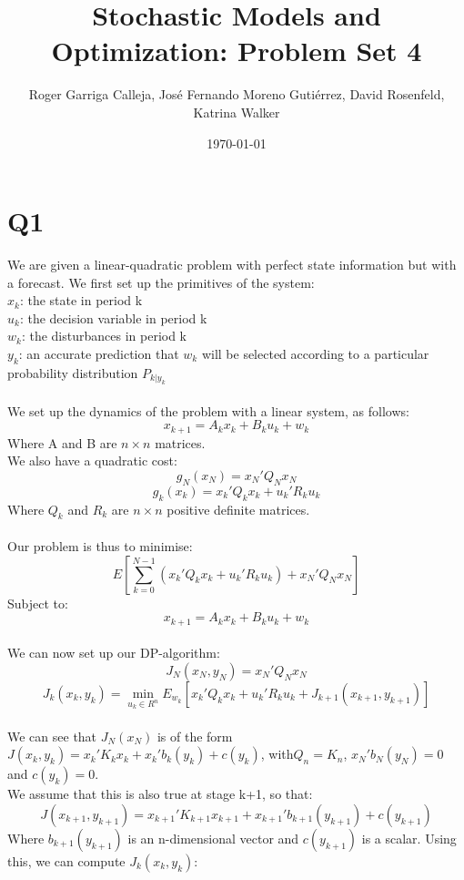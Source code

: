 \documentclass[11pt, english]{article}
\begin{document}
\title{Stochastic Models and Optimization: Problem Set 4}
\author{Roger Garriga Calleja, José Fernando Moreno Gutiérrez, David Rosenfeld, Katrina Walker}
\date{\today}
\maketitle
\section*{Q1}

We are given a linear-quadratic problem with perfect state information but with a forecast. We first set up the primitives of the system:\\
$x_k$: the state in period k\\
$u_k$: the decision variable in period k\\
$w_k$: the disturbances in period k\\
$y_k$: an accurate prediction that $w_k$ will be selected according to a particular probability distribution $P_{k|y_k}$\\
\\
We set up the dynamics of the problem with a linear system, as follows:
$$x_{k+1} = A_kx_k + B_ku_k + w_k$$
Where A and B are $n \times n$ matrices.\\
We also have a quadratic cost:
$$g_N(x_N) = x_N'Q_Nx_N$$
$$g_k(x_k) = x_k'Q_kx_k + u_k'R_ku_k$$
Where $Q_k$ and $R_k$ are $n \times n$ positive definite matrices.\\
\\
Our problem is thus to minimise:
$$E[\sum_{k=0}^{N-1}(x_k'Q_kx_k + u_k'R_ku_k) + x_N'Q_Nx_N]$$
Subject to:
$$x_{k+1} = A_kx_k + B_ku_k + w_k$$
\\
We can now set up our DP-algorithm:
$$J_N(x_N, y_N) = x_N'Q_Nx_N$$
$$J_k(x_k, y_k) = \min_{u_k \in R^n}E_{w_k}[x_k'Q_kx_k + u_k'R_ku_k + J_{k+1}(x_{k+1}, y_{k+1})]$$
\\
We can see that $J_N(x_N)$ is of the form $J(x_k, y_k) = x_k'K_kx_k + x_k'b_k(y_k) + c(y_k)$, with$Q_n = K_n$, $x_N'b_N(y_N) = 0$ and $c(y_k) = 0$.\\
We assume that this is also true at stage k+1, so that:
$$J(x_{k+1}, y_{k+1}) = x_{k+1}'K_{k+1}x_{k+1} + x_{k+1}'b_{k+1}(y_{k+1}) + c(y_{k+1})$$
Where $b_{k+1}(y_{k+1})$ is an n-dimensional vector and $c(y_{k+1})$ is a scalar.
Using this, we can compute $J_k(x_k, y_k)$:
\end{document}
